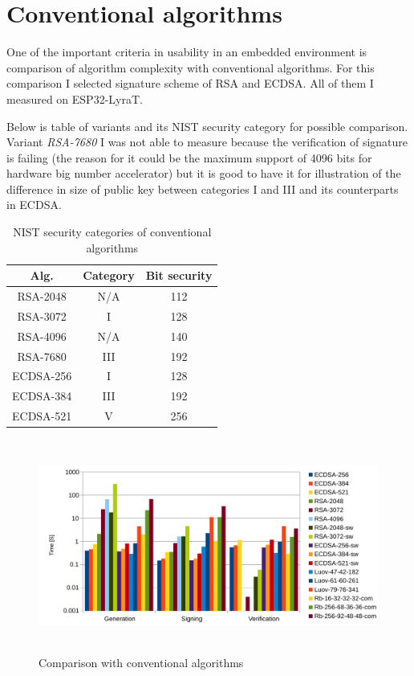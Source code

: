 \documentclass[thesis=M,english]{FITthesis}[2019/12/23]
\begin{document}
\newpage
\section{Conventional algorithms}
One of the important criteria in usability in an embedded environment is comparison of algorithm complexity with conventional algorithms. For this comparison I selected signature scheme of RSA and ECDSA. All of them I measured on ESP32-LyraT.

\bigskip
\noindent
Below is table of variants and its NIST security category for possible comparison. \cite{L-NIST-RECOMM} Variant \textit{RSA-7680} I was not able to measure because the verification of signature is failing (the reason for it could be the maximum support of 4096 bits for hardware big number accelerator) but it is good to have it for illustration of the difference in size of public key between categories I and III and its counterparts in ECDSA.
\begin{table}[H]
\centering
\begin{tabular}{|c|c|c|}
\hline
Alg. & Category & Bit security \\ \hline
RSA-2048 & N/A & 112 \\ \hline
RSA-3072 & I & 128 \\ \hline
RSA-4096 & N/A & 140 \\ \hline
RSA-7680 & III & 192 \\ \hline
ECDSA-256 & I & 128 \\ \hline
ECDSA-384 & III & 192 \\ \hline
ECDSA-521 & V & 256 \\ \hline
\end{tabular}
\caption{NIST security categories of conventional algorithms}
\end{table}

\begin{figure}[H]
\centering
\includegraphics[width=13cm,height=7cm]{images/time-all.pdf}
\caption{Comparison with conventional algorithms}
\label{time-all}
\end{figure}
\end{document}

